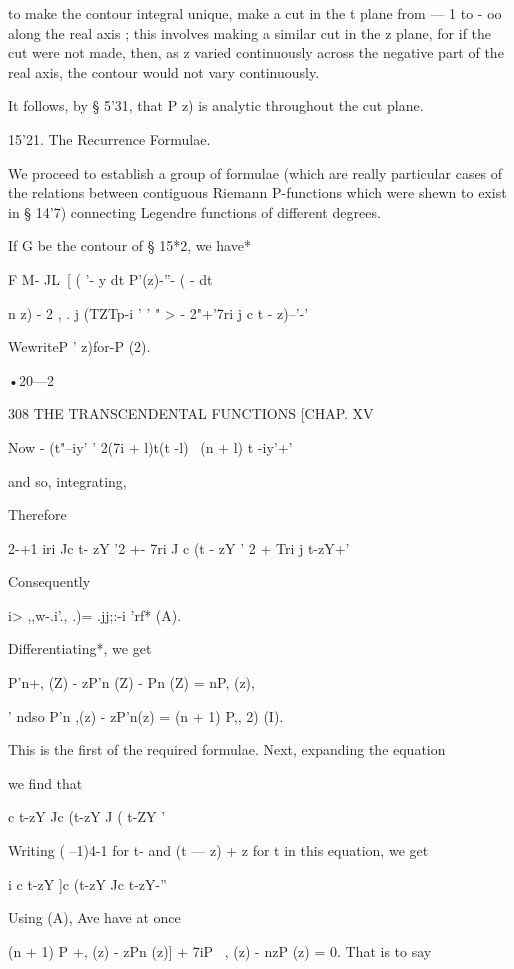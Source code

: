 {to make the contour integral unique, make a cut in the t plane from — 1 to - oo along the 
real axis ; this involves making a similar cut in the z plane, for if the cut were not made, 
then, as z varied continuously across the negative part of the real axis, the contour would 
not vary continuously. 

It follows, by § 5'31, that P   z) is analytic throughout the cut plane. 

15'21. The Recurrence Formulae. 

We proceed to establish a group of formulae (which are really particular 
cases of the relations between contiguous Riemann P-functions which were 
shewn to exist in § 14'7) connecting Legendre functions of different degrees. 

If G be the contour of § 15*2, we have* 

F M- JL\ [ ( '- y dt P'(z)-''-  (  -  dt 

 n  z) - 2  , . j   (TZTp-i ' '  "  > - 2"+'7ri j c  t - z)--'-' 



WewriteP ' z)for-P (2). 



•20—2 



308 THE TRANSCENDENTAL FUNCTIONS [CHAP. XV 

Now - (t"--iy' '   2(7i + l)t(t -l)  \  (n + l) t -iy'+' 

and so, integrating, 

Therefore 

2-+1 iri Jc t- zY '2 +- 7ri J c (t - zY ' 2 +  Tri j    t-zY+' 

Consequently 

i> ,,w-.i'., .)= .jj;:-i 'rf* (A). 

Differentiating*, we get 

P'n+, (Z) - zP'n (Z) - Pn (Z) = nP, (z), 

' ndso P'n ,(z) - zP'n(z) = (n + 1) P,, 2) (I). 

This is the first of the required formulae. 
Next, expanding the equation 

we find that 

c t-zY Jc (t-zY J ( t-ZY ' 

Writing ( --1)4-1 for t- and (t — z) + z for t in this equation, we get 

 i c t-zY ]c (t-zY Jc t-zY-'' 

Using (A), Ave have at once 

(n + 1)  P +, (z) - zPn (z)] + 7iP \ , (z) - nzP  (z) = 0. 
That is to say 

}
